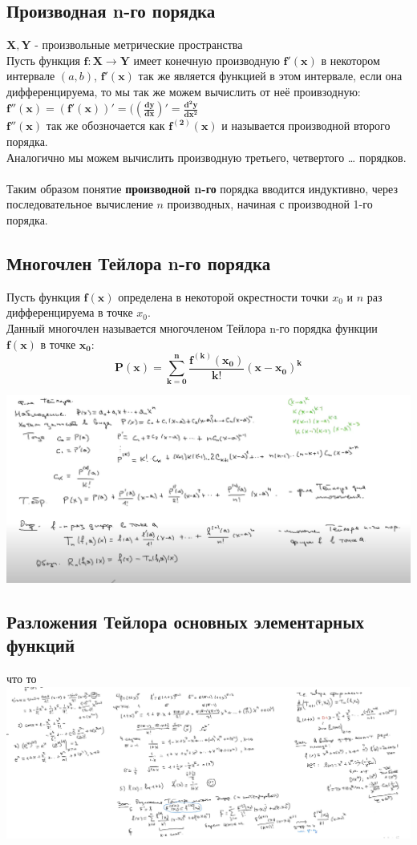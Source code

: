 \subsection{Производная n-го порядка}
$\mathbf{X, Y}$ - произвольные метрические пространства \\
Пусть функция $\mathbf{f : X \rightarrow Y}$ имеет конечную производную $\mathbf{f'(x)}$ в некотором интервале $(a, b)$, $\mathbf{f'(x)}$ так же является функцией в этом интервале, если она дифференцируема, то мы так же можем вычислить от неё проивзодную: 
$\mathbf{f''(x) = (f'(x))' = ((\frac{dy}{dx})' = \frac{d^{2}y}{dx^{2}}}$ \\
$\mathbf{f''(x)}$ так же обозночается как $\mathbf{f^{(2)}(x)}$ и называется производной второго порядка. \\ Аналогично мы можем вычислить производную третьего, четвертого \dots 
 порядков. \\\\
Таким образом понятие \textbf{производной n-го} порядка вводится индуктивно, через последовательное вычисление $n$ производных, начиная с производной 1-го порядка.

\newpage 
\subsection{Многочлен Тейлора n-го порядка}
Пусть функция $\mathbf{f(x)}$ определена в некоторой окрестности точки $x_0$ и $n$ раз дифференцируема в точке $x_0$. \\ 
Данный многочлен называется многочленом Тейлора n-го порядка функции $\mathbf{f(x)}$ в точке $\mathbf{x_0}$: 
$$\mathbf{P(x) = \sum_{k=0}^{n} \frac{f^{(k)}(x_0)}{k!} (x-x_0)^{k}}$$ 

\includegraphics[scale=0.65]{Images/многочлен_Тейлора.png}

\newpage
\subsection{Разложения Тейлора основных элементарных функций}
что то \\
\includegraphics[scale=0.5]{Images/элеменфункц.png}


 